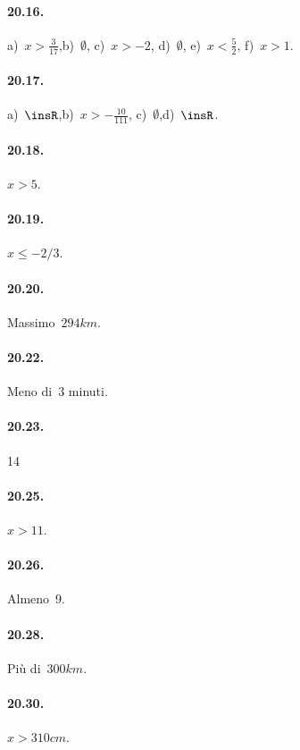 \paragraph{20.16.} a)~$x>\frac{3}{17}$,\quad b)~$\emptyset$,\quad
c)~$x>-2$, \quad d)~$\emptyset$, \quad e)~$x<\frac{5}{2}$, \quad f)~$x>1$.

\paragraph{20.17.} a)~$\insR$,\quad b)~$x>-{\frac{10}{111}}$,\quad
c)~$\emptyset $,\quad d)~$\insR$.

\begin{multicols}{2}
\paragraph{20.18.} $x>5$.

\paragraph{20.19.} $x\le -2/3$.

\paragraph{20.20.} Massimo~$294\unit{km}$.

\paragraph{20.22.} Meno di~3 minuti.

\paragraph{20.23.} 14

\paragraph{20.25.} $x>11$.

\paragraph{20.26.} Almeno~9.

\paragraph{20.28.} Più di~$300\unit{km}$.

\paragraph{20.30.} $x>310\unit{cm}$.


\end{multicols}
